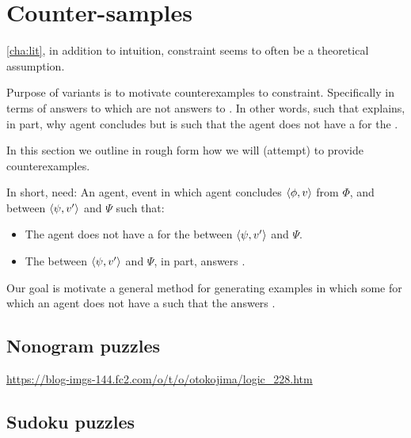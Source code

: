 \chapter{Counter-samples}
\label{cha:ces}

\begin{note}
  \autoref{cha:lit}, in addition to intuition, constraint seems to often be a theoretical assumption.

  Purpose of variants is to motivate counterexamples to constraint.
  Specifically in terms of answers to \qWhyV{} which are not answers to \qHowV{}.
  In other words, \ros{} such that \ros{} explains, in part, why agent concludes but is such that the agent does not have a \wit{} for the \ros{}.

  In this section we outline in rough form how we will (attempt) to provide counterexamples.

  In short, need:
  An agent, event in which agent concludes \(\langle \phi, v \rangle\) from \(\Phi\), and \ros{} between \(\langle \psi, v' \rangle\) and \(\Psi\) such that:

  \begin{itemize}
  \item
    The agent does not have a \wit{} for the \ros{} between \(\langle \psi, v' \rangle\) and \(\Psi\).
  \item
    The \ros{} between \(\langle \psi, v' \rangle\) and \(\Psi\), in part, answers \qWhyV{}.
  \end{itemize}

  Our goal is motivate a general method for generating examples in which some \ros{} for which an agent does not have a \wit{} such that the \ros{} answers \qWhyV{}.
\end{note}

\section{Nonogram puzzles}
\label{sec:nonogram-puzzles}

\url{https://blog-imgs-144.fc2.com/o/t/o/otokojima/logic_228.htm}

\section{Sudoku puzzles}

